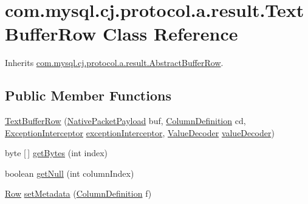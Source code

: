 \hypertarget{classcom_1_1mysql_1_1cj_1_1protocol_1_1a_1_1result_1_1_text_buffer_row}{}\section{com.\+mysql.\+cj.\+protocol.\+a.\+result.\+Text\+Buffer\+Row Class Reference}
\label{classcom_1_1mysql_1_1cj_1_1protocol_1_1a_1_1result_1_1_text_buffer_row}


Inherits \mbox{\hyperlink{classcom_1_1mysql_1_1cj_1_1protocol_1_1a_1_1result_1_1_abstract_buffer_row}{com.\+mysql.\+cj.\+protocol.\+a.\+result.\+Abstract\+Buffer\+Row}}.

\subsection*{Public Member Functions}
\begin{DoxyCompactItemize}
\item 
\mbox{\hyperlink{classcom_1_1mysql_1_1cj_1_1protocol_1_1a_1_1result_1_1_text_buffer_row_aa8590ac608223c7b5411e9a43fa8a40e}{Text\+Buffer\+Row}} (\mbox{\hyperlink{classcom_1_1mysql_1_1cj_1_1protocol_1_1a_1_1_native_packet_payload}{Native\+Packet\+Payload}} buf, \mbox{\hyperlink{interfacecom_1_1mysql_1_1cj_1_1protocol_1_1_column_definition}{Column\+Definition}} cd, \mbox{\hyperlink{interfacecom_1_1mysql_1_1cj_1_1exceptions_1_1_exception_interceptor}{Exception\+Interceptor}} \mbox{\hyperlink{classcom_1_1mysql_1_1cj_1_1protocol_1_1result_1_1_abstract_resultset_row_a50c0daccb2e9e7e2445af4a09d6fb9d0}{exception\+Interceptor}}, \mbox{\hyperlink{interfacecom_1_1mysql_1_1cj_1_1protocol_1_1_value_decoder}{Value\+Decoder}} \mbox{\hyperlink{classcom_1_1mysql_1_1cj_1_1protocol_1_1result_1_1_abstract_resultset_row_a62b113b0142a35b7962695b43b5b8e22}{value\+Decoder}})
\item 
byte \mbox{[}$\,$\mbox{]} \mbox{\hyperlink{classcom_1_1mysql_1_1cj_1_1protocol_1_1a_1_1result_1_1_text_buffer_row_a54253c1dda65ca0c96dc3ca1adf4b908}{get\+Bytes}} (int index)
\item 
boolean \mbox{\hyperlink{classcom_1_1mysql_1_1cj_1_1protocol_1_1a_1_1result_1_1_text_buffer_row_a7539d7bd87e15e6e315e67f7cc535aa6}{get\+Null}} (int column\+Index)
\item 
\mbox{\hyperlink{interfacecom_1_1mysql_1_1cj_1_1result_1_1_row}{Row}} \mbox{\hyperlink{classcom_1_1mysql_1_1cj_1_1protocol_1_1a_1_1result_1_1_text_buffer_row_a09f38001a62bec7e4723062fb7b1c156}{set\+Metadata}} (\mbox{\hyperlink{interfacecom_1_1mysql_1_1cj_1_1protocol_1_1_column_definition}{Column\+Definition}} f)
\end{DoxyCompactItemize}
